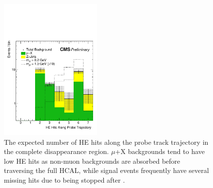 \begin{figure}[htbp]
	\centering
	\includegraphics[width=0.45\textwidth]{figures/totDisappHitsOverThresh.pdf}
	\caption[Expected Complete Disappearance HE Hits]{The expected number of HE hits along the probe track trajectory in the complete disappearance region. $\mu$+X backgrounds tend to have low HE hits as non-muon backgrounds are absorbed before traversing the full HCAL, while signal events frequently have several missing hits due to being stopped after \dbrem.}
	\label{fig:totHitsOverThresh}
\end{figure}


